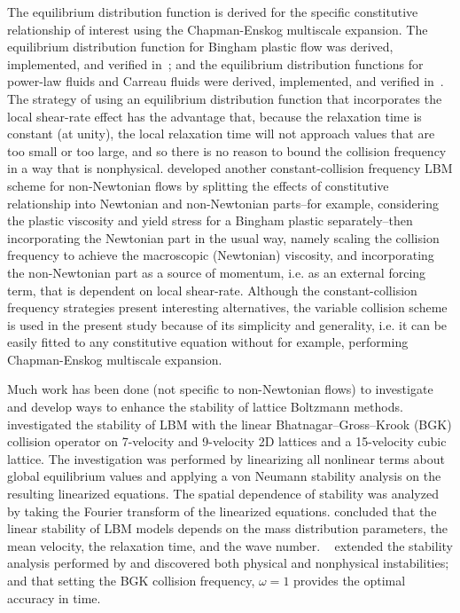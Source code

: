 \documentclass{article}
\begin{document}
The equilibrium distribution function is derived for the specific constitutive relationship of interest using the Chapman-Enskog multiscale expansion.
The equilibrium distribution function for Bingham plastic flow was derived, implemented, and verified in~\cite{wang2008lattice}; and the equilibrium distribution functions for power-law fluids and Carreau fluids were derived, implemented, and verified in~\cite{yoshino2007numerical}.
The strategy of using an equilibrium distribution function that incorporates the local shear-rate effect has the advantage that, because the relaxation time is constant (at unity), the local relaxation time will not approach values that are too small or too large, and so there is no reason to bound the collision frequency in a way that is nonphysical.
\citet{wang2011lattice} developed another constant-collision frequency LBM scheme for non-Newtonian flows by splitting the effects of constitutive relationship into Newtonian and non-Newtonian parts--for example, considering the plastic viscosity and yield stress for a Bingham plastic separately--then incorporating the Newtonian part in the usual way, namely scaling the collision frequency to achieve the macroscopic (Newtonian) viscosity, and incorporating the non-Newtonian part as a source of momentum, i.e. as an external forcing term, that is dependent on local shear-rate.
Although the constant-collision frequency strategies present interesting alternatives, the variable collision scheme is used in the present study because of its simplicity and generality, i.e. it can be easily fitted to any constitutive equation without for example, performing Chapman-Enskog multiscale expansion.

Much work has been done (not specific to non-Newtonian flows) to investigate and develop ways to enhance the stability of lattice Boltzmann methods.
\citet{sterling1993stability,sterling1996stability} investigated the stability of LBM with the linear Bhatnagar--Gross--Krook (BGK) collision operator on 7-velocity and 9-velocity 2D lattices and a 15-velocity cubic lattice.
The investigation was performed by linearizing all nonlinear terms about global equilibrium values and applying a von Neumann stability analysis on the resulting linearized equations.
The spatial dependence of stability was analyzed by taking the Fourier transform of the linearized equations.
\citeauthor{sterling1993stability} concluded that the linear stability of LBM models depends on the mass distribution parameters, the mean velocity, the relaxation time, and the wave number.
~\citet{worthing1997stability} extended the stability analysis performed by \citeauthor{sterling1993stability} and discovered both physical and nonphysical instabilities; and that setting the BGK collision frequency, $\omega = 1$ provides the optimal accuracy in time.
\end{document}
